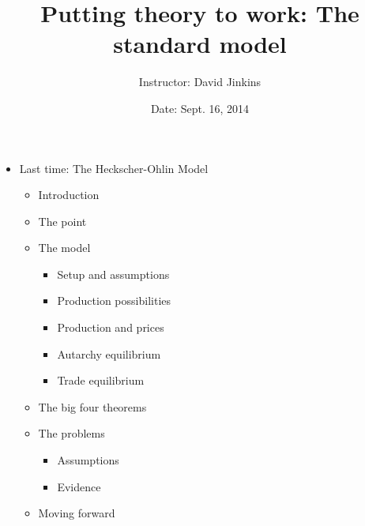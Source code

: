 \documentclass[ignorenonframetext,]{beamer}
\title{Putting theory to work: The standard model}
\author{Instructor: David Jinkins}
\date{Date: Sept. 16, 2014}
\begin{document}
\frame{\titlepage}

\begin{frame}
\begin{itemize}
\itemsep1pt\parskip0pt
\item
  Last time: The Heckscher-Ohlin Model
  \begin{itemize}
        \item Introduction
        \item The point
        \item The model
        \begin{itemize}
            \item Setup and assumptions
            \item Production possibilities
            \item Production and prices
            \item Autarchy equilibrium
            \item Trade equilibrium
        \end{itemize}
        \item The big four theorems
        \item The problems 
        \begin{itemize}
            \item Assumptions
            \item Evidence
        \end{itemize}
        \item Moving forward
    \end{itemize}
\end{itemize}

\end{frame}
\end{document}
